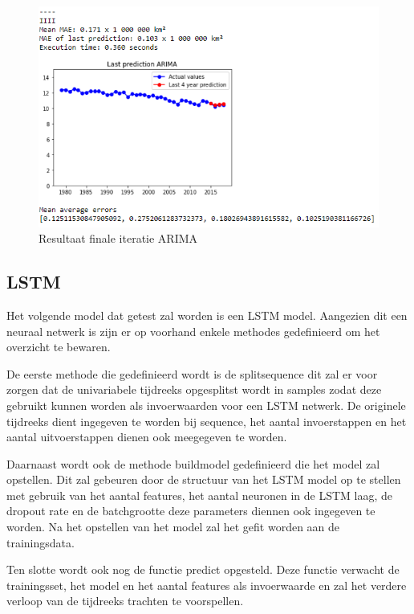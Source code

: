 \begin{figure}
    \centering
    \caption{Resultaat finale iteratie ARIMA}
    \label{fig:uvnsarima}
    \includegraphics[width=0.7\linewidth]{uv_ns_ARIMA}
\end{figure}

\clearpage
\subsection{LSTM}

Het volgende model dat getest zal worden is een LSTM model. Aangezien dit een neuraal netwerk is zijn er op voorhand enkele methodes gedefinieerd om het overzicht te bewaren. 

De eerste methode die gedefinieerd wordt is de split\textunderscore sequence dit zal er voor zorgen dat de univariabele tijdreeks opgesplitst wordt in samples zodat deze gebruikt kunnen worden als invoerwaarden voor een LSTM netwerk. De originele tijdreeks dient ingegeven te worden bij sequence, het aantal invoerstappen en het aantal uitvoerstappen dienen ook meegegeven te worden.

Daarnaast wordt ook de methode build\textunderscore model gedefinieerd die het model zal opstellen. Dit zal gebeuren door de structuur van het LSTM model op te stellen met gebruik van het aantal features, het aantal neuronen in de LSTM laag, de dropout rate en de batchgrootte deze parameters diennen ook ingegeven te worden. Na het opstellen van het model zal het gefit worden aan de trainingsdata.

Ten slotte wordt ook nog de functie predict opgesteld. Deze functie verwacht de trainingsset, het model en het aantal features als invoerwaarde en zal het verdere verloop van de tijdreeks trachten te voorspellen. 

